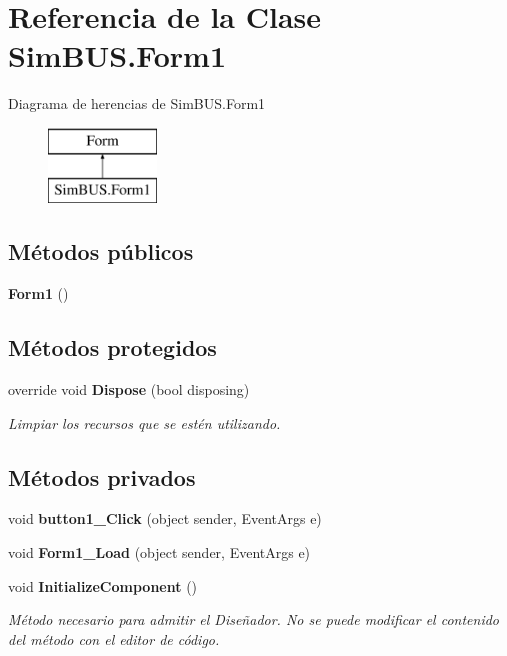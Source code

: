 \section{Referencia de la Clase Sim\-B\-U\-S.\-Form1}
\label{class_sim_b_u_s_1_1_form1}
Diagrama de herencias de Sim\-B\-U\-S.\-Form1\begin{figure}[H]
\begin{center}
\leavevmode
\includegraphics[height=2.000000cm]{class_sim_b_u_s_1_1_form1}
\end{center}
\end{figure}
\subsection*{Métodos públicos}
\begin{DoxyCompactItemize}
\item 
{\bf Form1} ()
\end{DoxyCompactItemize}
\subsection*{Métodos protegidos}
\begin{DoxyCompactItemize}
\item 
override void {\bf Dispose} (bool disposing)
\begin{DoxyCompactList}\small\item\em Limpiar los recursos que se estén utilizando. \end{DoxyCompactList}\end{DoxyCompactItemize}
\subsection*{Métodos privados}
\begin{DoxyCompactItemize}
\item 
void {\bf button1\-\_\-\-Click} (object sender, Event\-Args e)
\item 
void {\bf Form1\-\_\-\-Load} (object sender, Event\-Args e)
\item 
void {\bf Initialize\-Component} ()
\begin{DoxyCompactList}\small\item\em Método necesario para admitir el Diseñador. No se puede modificar el contenido del método con el editor de código. \end{DoxyCompactList}\end{DoxyCompactItemize}
